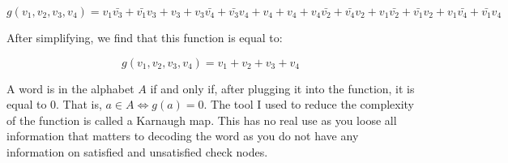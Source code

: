 \documentclass{article}
\begin{document}
$$g(v_1, v_2, v_3, v_4) = v_1\bar{v_3} + \bar{v_1}v_3 + v_3 + v_3\bar{v_4} + \bar{v_3}v_4 + v_4 + v_4 + v_4\bar{v_2} + \bar{v_4}v_2 + v_1\bar{v_2} + \bar{v_1}v_2 + v_1\bar{v_4} + \bar{v_1}v_4$$

After simplifying, we find that this function is equal to:

$$g(v_1, v_2, v_3, v_4) = v_1 + v_2 + v_3 + v_4$$

A word is in the alphabet $A$ if and only if, after plugging it into the function, it is equal to 0. That is, $a \in A \iff g(a) = 0$. The tool I used to reduce the complexity of the function is called a Karnaugh map. This has no real use as you loose all information that matters to decoding the word as you do not have any information on satisfied and unsatisfied check nodes.
\end{document}

